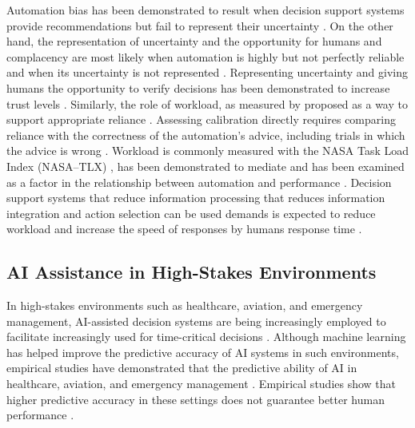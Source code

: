 \documentclass[journal]{IEEEtran}
\theoremstyle{plain}
\theoremstyle{definition}
\providecommand{\DIFaddtex}[1]{{\protect\color{blue} \sf #1}} %
\providecommand{\DIFdeltex}[1]{{\protect\color{red} \scriptsize #1}} %
\providecommand{\DIFaddbegin}{} %
\providecommand{\DIFaddend}{} %
\providecommand{\DIFdelbegin}{} %
\providecommand{\DIFdelend}{} %
\providecommand{\DIFadd}[1]{\texorpdfstring{\DIFaddtex{#1}}{#1}} %
\providecommand{\DIFdel}[1]{\texorpdfstring{\DIFdeltex{#1}}{}} %
\newcommand{\DIFscaledelfig}{0.5}
\newlength{\DIFdelgraphicswidth} %
\newlength{\DIFdelgraphicsheight} %
\newcommand{\DIFaddincludegraphics}[2][]{{\color{blue}\fbox{\DIFOincludegraphics[#1]{#2}}}} %
\newcommand{\DIFdelincludegraphics}[2][]{%
\sbox{\DIFdelgraphicsbox}{\DIFOincludegraphics[#1]{#2}}%
\settoboxwidth{\DIFdelgraphicswidth}{\DIFdelgraphicsbox} %
\settoboxtotalheight{\DIFdelgraphicsheight}{\DIFdelgraphicsbox} %
\scalebox{\DIFscaledelfig}{%
\parbox[b]{\DIFdelgraphicswidth}{\usebox{\DIFdelgraphicsbox}\\[-\baselineskip] \rule{\DIFdelgraphicswidth}{0em}}\llap{\resizebox{\DIFdelgraphicswidth}{\DIFdelgraphicsheight}{%
\setlength{\unitlength}{\DIFdelgraphicswidth}%
\begin{picture}(1,1)%
\thicklines\linethickness{2pt} %
{\color[rgb]{1,0,0}\put(0,0){\framebox(1,1){}}}%
{\color[rgb]{1,0,0}\put(0,0){\line( 1,1){1}}}%
{\color[rgb]{1,0,0}\put(0,1){\line(1,-1){1}}}%
\end{picture}%
}\hspace*{3pt}}} %
} %
\DeclareRobustCommand{\DIFaddbegin}{\DIFOaddbegin \let\includegraphics\DIFaddincludegraphics} %
\DeclareRobustCommand{\DIFaddend}{\DIFOaddend \let\includegraphics\DIFOincludegraphics} %
\DeclareRobustCommand{\DIFdelbegin}{\DIFOdelbegin \let\includegraphics\DIFdelincludegraphics} %
\DeclareRobustCommand{\DIFdelend}{\DIFOaddend \let\includegraphics\DIFOincludegraphics} %
\begin{document}
Automation bias \DIFdelbegin \DIFdel{has been demonstrated to result when decision support systems provide recommendations but fail to represent their uncertainty \cite{Raji2019AIES,Weidinger2022FAccT}. On the other hand, the representation of uncertainty and the opportunity for humans }\DIFdelend \DIFaddbegin \DIFadd{and complacency are most likely when automation is highly but not perfectly reliable and when its uncertainty is not represented \cite{Parasuraman2010,Weidinger2022FAccT}. Representing uncertainty and giving humans the opportunity }\DIFaddend to verify decisions has been \DIFdelbegin \DIFdel{demonstrated to increase trust levels \cite{Miller2019XRDS,Bach2024Access}. Similarly, the role of workload, as measured by }\DIFdelend \DIFaddbegin \DIFadd{proposed as a way to support appropriate reliance \cite{Miller2019XRDS,Bach2024Access}. Assessing calibration directly requires comparing reliance with the correctness of the automation's advice, including trials in which the advice is wrong \cite{Lee2004,Parasuraman2010}. Workload is commonly measured with }\DIFaddend the NASA Task Load Index (NASA--TLX) \DIFdelbegin \DIFdel{, has been demonstrated to mediate }\DIFdelend \DIFaddbegin \DIFadd{\cite{Hart1988} and has been examined as a factor in }\DIFaddend the relationship between automation and performance \cite{Hodgson2013THMS,Yang2022THMSReview}. Decision support \DIFdelbegin \DIFdel{systems that reduce information processing }\DIFdelend \DIFaddbegin \DIFadd{that reduces information integration }\DIFaddend and action selection \DIFdelbegin \DIFdel{can be used }\DIFdelend \DIFaddbegin \DIFadd{demands is expected }\DIFaddend to reduce workload and \DIFdelbegin \DIFdel{increase the speed of responses by humans }\DIFdelend \DIFaddbegin \DIFadd{response time }\DIFaddend \cite{Lai2023FAccT,Muller2022CHIWORK}.

\subsection{AI Assistance in High-Stakes Environments}
\DIFdelbegin \DIFdel{In high-stakes environments such as healthcare, aviation, and emergency management, }\DIFdelend AI-assisted decision systems are \DIFdelbegin \DIFdel{being increasingly employed to facilitate }\DIFdelend \DIFaddbegin \DIFadd{increasingly used for }\DIFaddend time-critical decisions \DIFdelbegin \DIFdel{\cite{PerezCerrolaza2024CSUR,Bach2024Access,Rokhideh2025IJDRS,Rao2024IJDRS}. Although machine learning has helped improve the predictive accuracy of AI systems in such environments, empirical studies have demonstrated that the predictive ability of AI }\DIFdelend \DIFaddbegin \DIFadd{in healthcare, aviation, and emergency management \cite{PerezCerrolaza2024CSUR,Bach2024Access,Rokhideh2025IJDRS,Rao2024IJDRS}. Empirical studies show that higher predictive accuracy in these settings }\DIFaddend does not guarantee better human performance \cite{Lai2023FAccT,Yang2022THMSReview}.
\end{document}
